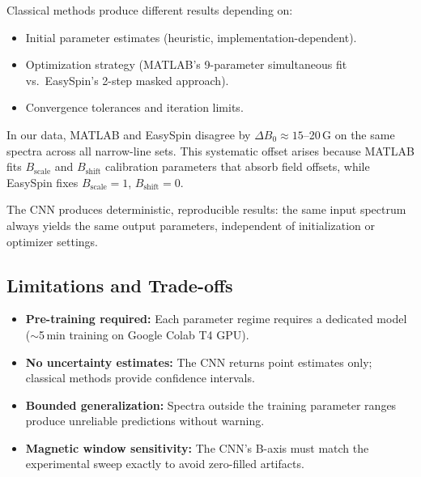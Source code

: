\documentclass[a4paper,11pt]{article}
\begin{document}
Classical methods produce different results depending on:
\begin{itemize}
    \item Initial parameter estimates (heuristic, implementation-dependent).
    \item Optimization strategy (MATLAB's 9-parameter simultaneous fit
          vs.\ EasySpin's 2-step masked approach).
    \item Convergence tolerances and iteration limits.
\end{itemize}

In our data, MATLAB and EasySpin disagree by $\Delta B_0 \approx 15$--20\,G
on the same spectra across all narrow-line sets. This systematic offset
arises because MATLAB fits $B_\mathrm{scale}$ and $B_\mathrm{shift}$
calibration parameters that absorb field offsets, while EasySpin fixes
$B_\mathrm{scale} = 1$, $B_\mathrm{shift} = 0$.

The CNN produces deterministic, reproducible results: the same input
spectrum always yields the same output parameters, independent of
initialization or optimizer settings.

\subsection{Limitations and Trade-offs}

\begin{itemize}
    \item \textbf{Pre-training required:} Each parameter regime requires
          a dedicated model ($\sim$5\,min training on Google Colab T4 GPU).
    \item \textbf{No uncertainty estimates:} The CNN returns point estimates
          only; classical methods provide confidence intervals.
    \item \textbf{Bounded generalization:} Spectra outside the training
          parameter ranges produce unreliable predictions without warning.
    \item \textbf{Magnetic window sensitivity:} The CNN's B-axis must match
          the experimental sweep exactly to avoid zero-filled artifacts.
\end{itemize}
\end{document}
